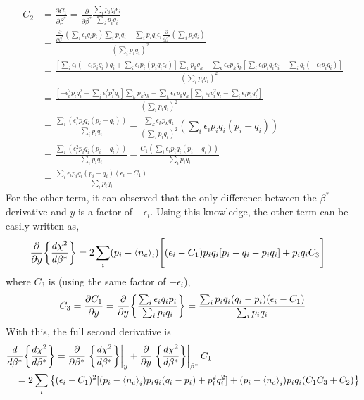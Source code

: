 \begin{align}
    C_2&=\frac{\partial C_1}{\partial \beta^*}=\frac{\partial}{\partial \beta^*} \frac{\sum_i p_i q_i \epsilon_i}{\sum_i p_i q_i}\nonumber\\
    &=\frac{\frac{\partial }{\partial \beta^*}(\sum_i \epsilon_i q_i p_i) \sum_i p_i q_i - \sum_i p_i q_i \epsilon_i \frac{\partial}{\partial \beta^*}(\sum_i p_i q_i)}{(\sum_i p_i q_i)^2}\nonumber\\
    &=\frac{[\sum_i \epsilon_i(-\epsilon_i p_i q_i)q_i + \sum_i \epsilon_i p_i (p_i q_i \epsilon_i)]\sum_k p_k q_k-\sum_k \epsilon_k p_k q_k[\sum_i \epsilon_i p_i q_i p_i+\sum_i q_i(-\epsilon_i p_i q_i)]}{(\sum_i p_i q_i)^2}\nonumber\\
    &=\frac{[-\epsilon_i^2p_i q_i^2+ \sum_i \epsilon_i^2 p_i^2 q_i]\sum_k p_k q_k-\sum_k \epsilon_k p_k q_k[\sum_i \epsilon_i p_i^2 q_i-\sum_i \epsilon_i p_i q_i^2]}{(\sum_i p_i q_i)^2}\nonumber\\
    &=\frac{\sum_i(\epsilon_i^2 p_i q_i(p_i-q_i))}{\sum_i p_i q_i}-\frac{\sum_k \epsilon_k p_k q_k}{(\sum_i p_i q_i)^2}(\sum_i \epsilon_i p_i q_i (p_i-q_i))\nonumber\\
    &=\frac{\sum_i(\epsilon_i^2 p_i q_i(p_i-q_i))}{\sum_i p_i q_i}-\frac{C_1(\sum_i \epsilon_i p_i q_i (p_i-q_i))}{\sum_i p_i q_i}\nonumber\\
    &=\frac{\sum_i \epsilon_i p_i q_i(p_i - q_i)(\epsilon_i-C_1)}{\sum_i p_i q_i}
\end{align}
For the other term, it can observed that the only difference between the $\beta^*$ derivative and $y$ is a factor of $-\epsilon_i$. Using this knowledge, the other term can be easily written as,
\begin{align}
    \frac{\partial}{\partial y}\qty{\frac{d\chi^2}{d\beta^*}}&=2 
    \sum_i (p_i-\left<{n_c}\right>_i)\Biggr[(\epsilon_i-C_1)p_iq_i[p_i-q_i-p_iq_i]+p_iq_iC_3\Biggr]
\end{align}
where $C_3$ is (using the same factor of $-\epsilon_i$),
\begin{gather}
    C_3=\frac{\partial C_1}{\partial y}=\frac{\partial}{\partial 
    y}\qty{\frac{\sum_i \epsilon_i q_i p_i}{\sum_i p_i q_i}}=\frac{\sum_i p_i q_i(q_i-p_i)(\epsilon_i-C_1)}{\sum_i p_i q_i}
\end{gather}
With this, the full second derivative is
\begin{align}
&\frac{d}{d\beta^*} \qty{\frac{d \chi^2}{d\beta^*}} = \frac{\partial }{\partial \beta^*} \eval{\qty{\frac{d \chi^2}{d\beta^*}}}_y+ \frac{\partial }{\partial y} \eval{\qty{\frac{d \chi^2}{d\beta^*}}}_{\beta^*} C_1\nonumber\\
&\quad=2\sum_i\qty{(\epsilon_i-C_1)^2[(p_i-\avg{n_c}_i)p_iq_i(q_i-p_i)+p_i^2q_i^2]+(p_i-\avg{n_c}_i)p_iq_i(C_1C_3+C_2)}
\end{align}